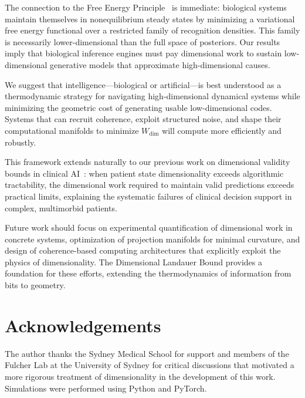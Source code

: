 \documentclass[12pt]{article}
\begin{document}
The connection to the Free Energy Principle~\citep{friston2010} is immediate: biological systems maintain themselves in nonequilibrium steady states by minimizing a variational free energy functional over a restricted family of recognition densities. This family is necessarily lower-dimensional than the full space of posteriors. Our results imply that biological inference engines must pay dimensional work to sustain low-dimensional generative models that approximate high-dimensional causes.

We suggest that intelligence---biological or artificial---is best understood as a thermodynamic strategy for navigating high-dimensional dynamical systems while minimizing the geometric cost of generating usable low-dimensional codes. Systems that can recruit coherence, exploit structured noise, and shape their computational manifolds to minimize $W_{\mathrm{dim}}$ will compute more efficiently and robustly.

This framework extends naturally to our previous work on dimensional validity bounds in clinical AI~\citep{todd2025}: when patient state dimensionality exceeds algorithmic tractability, the dimensional work required to maintain valid predictions exceeds practical limits, explaining the systematic failures of clinical decision support in complex, multimorbid patients.

Future work should focus on experimental quantification of dimensional work in concrete systems, optimization of projection manifolds for minimal curvature, and design of coherence-based computing architectures that explicitly exploit the physics of dimensionality. The Dimensional Landauer Bound provides a foundation for these efforts, extending the thermodynamics of information from bits to geometry.

\section*{Acknowledgements}

The author thanks the Sydney Medical School for support and members of the Fulcher Lab at the University of Sydney for critical discussions that motivated a more rigorous treatment of dimensionality in the development of this work. Simulations were performed using Python and PyTorch.



\end{document}
